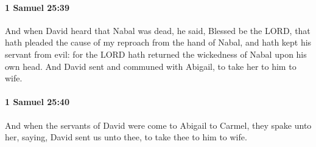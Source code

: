 		\paragraph{1 Samuel 25:39} %
			\label{1SAMUEL-25-39}

			And when David heard that Nabal was dead, he said, Blessed be the LORD, that hath pleaded the cause of my reproach from the hand of Nabal, and hath kept his servant from evil: for the LORD hath returned the wickedness of Nabal upon his own head. And David sent and communed with Abigail, to take her to him to wife.


		\paragraph{1 Samuel 25:40} %
			\label{1SAMUEL-25-40}

			And when the servants of David were come to Abigail to Carmel, they spake unto her, saying, David sent us unto thee, to take thee to him to wife.

